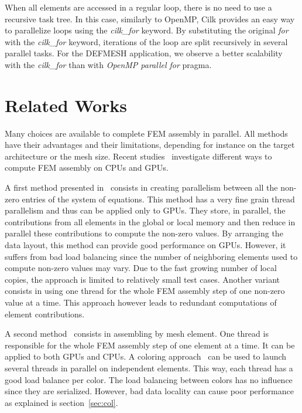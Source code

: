 \documentclass{IOS-Book-Article}
\begin{document}
When all elements are accessed in a regular loop, there is no need to use a recursive task tree.
In this case, similarly to OpenMP, Cilk provides an easy way to parallelize loops using the \emph{cilk\_for} keyword.
By substituting the original \emph{for} with the \emph{cilk\_for} keyword, iterations of the loop are split recursively in several parallel tasks.
For the DEFMESH application, we observe a better scalability with the \emph{cilk\_for} than with \emph{OpenMP parallel for} pragma.


\section{Related Works}
Many choices are available to complete FEM assembly in parallel.
All methods have their advantages and their limitations, depending for instance on the target architecture or the mesh size.
Recent studies~\cite{cecka2011assembly,CPUGPUasm} investigate different ways to compute FEM assembly on CPUs and GPUs.

A first method presented in~\cite{cecka2011assembly} consists in creating parallelism between all the non-zero entries of the system of equations.
This method has a very fine grain thread parallelism and thus can be applied only to GPUs.
They store, in parallel, the contributions from all elements in the global or local memory and then reduce in parallel these contributions to compute the non-zero values.
By arranging the data layout, this method can provide good performance on GPUs.
However, it suffers from bad load balancing since the number of neighboring elements used to compute non-zero values may vary.
Due to  the fast growing number of local copies, the approach is limited to relatively small test cases.
Another variant consists in using one thread for the whole FEM assembly step of one non-zero value at a time. This approach however leads to redundant computations of element contributions.

A second method~\cite{cecka2011assembly} consists in assembling by mesh element. One thread is responsible for the whole FEM assembly step of one element at a time.
It can be applied to both GPUs and CPUs.
A coloring approach~\cite{CUDAfe,CPUfe} can be used to launch several threads in parallel on independent elements.
This way, each thread has a good load balance per color. The load balancing between colors has no influence since they are serialized.
However, bad data locality can cause poor performance as explained is section~\ref{sec:col}.
\end{document}
